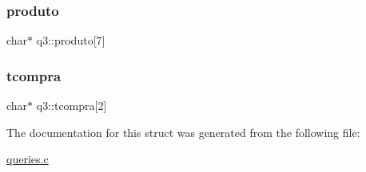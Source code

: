 \mbox{\label{structq3_a8df0bfcf987c6fbc8b06683be4f44842}} 
\subsubsection{\texorpdfstring{produto}{produto}}
{\footnotesize\ttfamily char$\ast$ q3\+::produto\mbox{[}7\mbox{]}}

\mbox{\label{structq3_ab726a8ec279be17c66c7bb4f6048da4f}} 
\subsubsection{\texorpdfstring{tcompra}{tcompra}}
{\footnotesize\ttfamily char$\ast$ q3\+::tcompra\mbox{[}2\mbox{]}}



The documentation for this struct was generated from the following file\+:\begin{DoxyCompactItemize}
\item 
\mbox{\hyperlink{queries_8c}{queries.\+c}}\end{DoxyCompactItemize}
